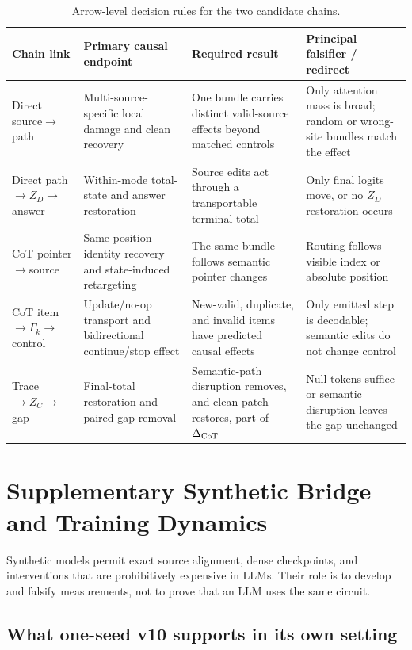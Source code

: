 \documentclass[11pt]{article}
\begin{document}
\begin{table}[H]
\centering
\small
\caption{Arrow-level decision rules for the two candidate chains.}
\label{tab:falsifiers}
\begin{tabularx}{\textwidth}{@{}P{.18\textwidth}P{.25\textwidth}Y Y@{}}
\toprule
Chain link & Primary causal endpoint & Required result & Principal falsifier / redirect \\
\midrule
Direct source$\rightarrow$path & Multi-source-specific local damage and clean recovery & One bundle carries distinct valid-source effects beyond matched controls & Only attention mass is broad; random or wrong-site bundles match the effect \\
Direct path$\rightarrow Z_D\rightarrow$answer & Within-mode total-state and answer restoration & Source edits act through a transportable terminal total & Only final logits move, or no $Z_D$ restoration occurs \\
CoT pointer$\rightarrow$source & Same-position identity recovery and state-induced retargeting & The same bundle follows semantic pointer changes & Routing follows visible index or absolute position \\
CoT item$\rightarrow\Gamma_k\rightarrow$control & Update/no-op transport and bidirectional continue/stop effect & New-valid, duplicate, and invalid items have predicted causal effects & Only emitted step is decodable; semantic edits do not change control \\
Trace$\rightarrow Z_C\rightarrow$gap & Final-total restoration and paired gap removal & Semantic-path disruption removes, and clean patch restores, part of $\Delta_{\rm CoT}$ & Null tokens suffice or semantic disruption leaves the gap unchanged \\
\bottomrule
\end{tabularx}
\end{table}

\section{Supplementary Synthetic Bridge and Training Dynamics}
\label{sec:synthetic}

Synthetic models permit exact source alignment, dense checkpoints, and interventions that are prohibitively expensive in LLMs. Their role is to develop and falsify measurements, not to prove that an LLM uses the same circuit.

\subsection{What one-seed v10 supports in its own setting}
\end{document}
